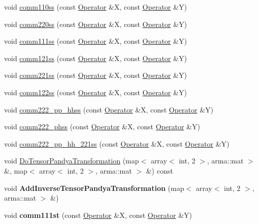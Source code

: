 \begin{DoxyCompactItemize}
\item 
void \hyperlink{classOperator_a39adf2f2f225609606da088b59e3502a}{comm110ss} (const \hyperlink{classOperator}{Operator} \&X, const \hyperlink{classOperator}{Operator} \&Y)
\item 
void \hyperlink{classOperator_a8ea2254b8012c53ff6063a90ab7a5796}{comm220ss} (const \hyperlink{classOperator}{Operator} \&X, const \hyperlink{classOperator}{Operator} \&Y)
\item 
void \hyperlink{classOperator_ae22e28ebda5b170f2cdc4d2d9462971a}{comm111ss} (const \hyperlink{classOperator}{Operator} \&X, const \hyperlink{classOperator}{Operator} \&Y)
\item 
void \hyperlink{classOperator_af80e0152e9dffb0194b8b26c5d75d815}{comm121ss} (const \hyperlink{classOperator}{Operator} \&X, const \hyperlink{classOperator}{Operator} \&Y)
\item 
void \hyperlink{classOperator_abd2096925a9b0028ee988255955b907f}{comm221ss} (const \hyperlink{classOperator}{Operator} \&X, const \hyperlink{classOperator}{Operator} \&Y)
\item 
void \hyperlink{classOperator_a4f4738296848a6d504c331456f361736}{comm122ss} (const \hyperlink{classOperator}{Operator} \&X, const \hyperlink{classOperator}{Operator} \&Y)
\item 
void \hyperlink{classOperator_ae040aa05d6a84031c90ba2259cbb05ae}{comm222\-\_\-pp\-\_\-hhss} (const \hyperlink{classOperator}{Operator} \&X, const \hyperlink{classOperator}{Operator} \&Y)
\item 
void \hyperlink{classOperator_a25b768c4ddceead49af1c7f69d5071ea}{comm222\-\_\-phss} (const \hyperlink{classOperator}{Operator} \&X, const \hyperlink{classOperator}{Operator} \&Y)
\item 
void \hyperlink{classOperator_adf70943fb0ad3c36ea27c1c14dc7f6ec}{comm222\-\_\-pp\-\_\-hh\-\_\-221ss} (const \hyperlink{classOperator}{Operator} \&X, const \hyperlink{classOperator}{Operator} \&Y)
\item 
void \hyperlink{classOperator_a0617428dea2cdef1150a6bda0003c7f5}{Do\-Tensor\-Pandya\-Transformation} (map$<$ array$<$ int, 2 $>$, arma\-::mat $>$ \&, map$<$ array$<$ int, 2 $>$, arma\-::mat $>$ \&) const 
\item 
\hypertarget{classOperator_abbc466d8e8f57deb156d9475b680fd42}{void {\bfseries Add\-Inverse\-Tensor\-Pandya\-Transformation} (map$<$ array$<$ int, 2 $>$, arma\-::mat $>$ \&)}\label{classOperator_abbc466d8e8f57deb156d9475b680fd42}

\item 
\hypertarget{classOperator_a9e365e6c594c517083fe6af1eb5907b2}{void {\bfseries comm111st} (const \hyperlink{classOperator}{Operator} \&X, const \hyperlink{classOperator}{Operator} \&Y)}\label{classOperator_a9e365e6c594c517083fe6af1eb5907b2}


\end{DoxyCompactItemize}
